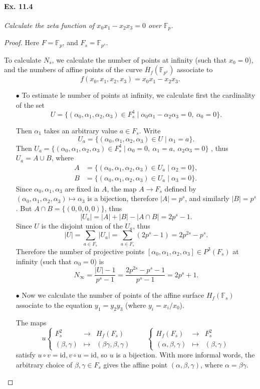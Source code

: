\documentclass[11pt,a4paper]{article}
\newcommand{\F}{\mathbb{F}}
\begin{document}
\paragraph{Ex. 11.4}{\it Calculate the zeta function of $x_0 x_1 - x_2 x_3 = 0$ over $\F_p$.
}
\begin{proof}
Here $F = \F_p$, and $F_s = \F_{p^s}$.

To calculate $N_s$, we calculate the number of points at infinity (such that $x_0 = 0$), and the numbers of affine points of the curve $\overline{H}_f(\F_{p^s})$ associate to $$f(x_0,x_1,x_2,x_3) = x_0 x_1 - x_2 x_3.$$
\begin{enumerate}
\item[$\bullet$] To estimate le number of points at infinity, we calculate first the cardinality of the set
$$U = \{(\alpha_0,\alpha_1,\alpha_2,\alpha_3) \in F_s^4 \mid \alpha_0 \alpha_1 - \alpha_2  \alpha_3 =0,\ \alpha_0 = 0\}.$$ 

Then $\alpha_1$ takes an arbitrary value $a \in F_s$. Write
$$U_a =\{(\alpha_0,\alpha_1,\alpha_2,\alpha_3) \in U \mid  \alpha_1 = a\}.$$
Then $U_a =\{(\alpha_0,\alpha_1,\alpha_2,\alpha_3) \in  F_s^4\mid  \alpha_0 = 0,\ \alpha_1 = a,\ \alpha_2\alpha_3 = 0\}$ , thus $U_a = A \cup B$, where 
\begin{align*}
A &= \{(\alpha_0,\alpha_1,\alpha_2,\alpha_3) \in U_a \mid \alpha_2 = 0\},\\
B &= \{(\alpha_0,\alpha_1,\alpha_2,\alpha_3) \in U_a \mid \alpha_3 = 0\}.
\end{align*}
Since $\alpha_0,\alpha_1,\alpha_3$ are fixed in $A$, the map $A \to F_s$ defined by $(\alpha_0,\alpha_1,\alpha_2,\alpha_3) \mapsto \alpha_3$ is a bijection, therefore $|A| = p^s$, and similarly $|B| = p^s$. But $A\cap B = \{(0,0,0,0)\}$, thus 
$$|U_a| = |A| + |B| - |A\cap B| = 2p^s - 1.$$
Since $U$ is the disjoint union of the $U_a$, thus
$$|U| = \sum_{a\in F_s} |U_a| = \sum_{a\in F_s} (2p^s - 1) = 2p^{2s} - p^s .$$
Therefore the number of projective points $[\alpha_0,\alpha_1,\alpha_2,\alpha_3] \in P^3(F_s)$ at infinity (such that $\alpha_0 = 0$) is
$$N_\infty = \frac{|U|-1}{p^s-1} =\frac{ 2p^{2s} - p^s -1}{p^s-1} = 2p^s+1.$$

\item[$\bullet$] Now we calculate the number of points of the affine surface $H_f(\F_s)$ associate to the equation $y_1 = y_2 y_3$ (where $y_i = x_i/x_0$).

The maps 
$$
u
\left\{
\begin{array}{ccl}
F_s^2 & \to & H_f(F_s)\\
(\beta, \gamma) & \mapsto &(\beta \gamma, \beta, \gamma)
\end{array}
\right.
\qquad
\left\{
\begin{array}{ccl}
H_f(F_s) & \to & F_s^2\\
(\alpha,\beta, \gamma) & \mapsto & ( \beta, \gamma)
\end{array}
\right.
$$
satisfy $u \circ v = \mathrm{id}, v\circ u = \mathrm{id}$, so $u$ is a bijection. With more informal words, the arbitrary choice of $\beta, \gamma \in F_s$ gives the affine point $(\alpha,\beta,\gamma)$, where $\alpha = \beta \gamma$.


\end{enumerate}
\end{proof}
\end{document}
